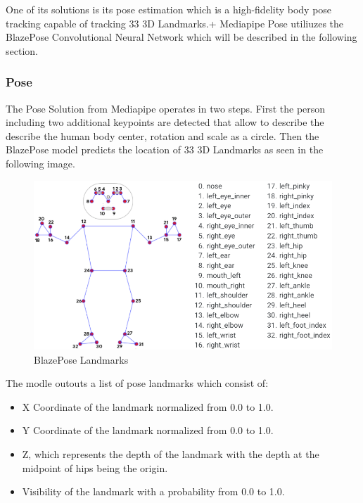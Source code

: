 \documentclass[a4paper,11pt,singlespacing]{article}
\begin{document}
One of its solutions is its pose estimation which is a high-fidelity body pose tracking capable of tracking 33 3D Landmarks.+
Mediapipe Pose utiliuzes the BlazePose\cite{BlazePosePaper} Convolutional Neural Network which will be described in the following section.

\subsubsection{Pose}

The Pose Solution from Mediapipe operates in two steps.
First the person including two additional keypoints are detected that allow to describe the 
describe the human body center, rotation and scale as a circle.
Then the BlazePose model predicts the location of 33 3D Landmarks as seen in the following image.

\begin{figure}[H]
	\centering
	\includegraphics[width=\textwidth]{images/mediapipe_landmarks.png}
	\caption{BlazePose Landmarks}
	\label{mediapipe_landmarks}
\end{figure}

The modle outouts a list of pose landmarks which consist of:
\begin{itemize}
	\item X Coordinate of the landmark normalized from 0.0 to 1.0.
	\item Y Coordinate of the landmark normalized from 0.0 to 1.0.
	\item Z, which represents the depth of the landmark with the depth at the midpoint of hips being the origin.
	\item Visibility of the landmark with a probability from 0.0 to 1.0.
\end{itemize}

\pagebreak
\end{document}
